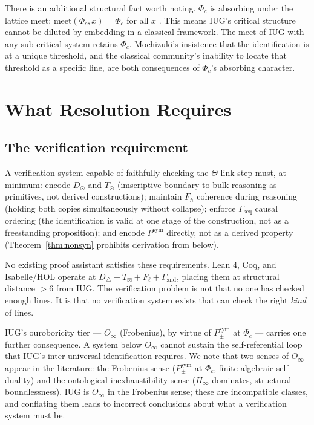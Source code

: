 \documentclass[12pt]{article}
\theoremstyle{plain}
\theoremstyle{definition}
\theoremstyle{remark}
\begin{document}
There is an additional structural fact worth noting. $\Phi_c$ is absorbing under the lattice
meet: $\text{meet}(\Phi_c, x) = \Phi_c$ for all $x$ \cite{synthref}. This means IUG's
critical structure cannot be diluted by embedding in a classical framework. The meet of IUG
with any sub-critical system retains $\Phi_c$. Mochizuki's insistence that the identification
is at a unique threshold, and the classical community's inability to locate that threshold
as a specific line, are both consequences of $\Phi_c$'s absorbing character.

\section{What Resolution Requires}
\label{sec:resolution}

\subsection{The verification requirement}
\label{subsec:requirement}

A verification system capable of faithfully checking the $\Theta$-link step must,
at minimum: encode $D_\odot$ and $T_\odot$ (imscriptive boundary-to-bulk reasoning as
primitives, not derived constructions); maintain $F_\hbar$ coherence during reasoning
(holding both copies simultaneously without collapse); enforce $\Gamma_\text{seq}$ causal
ordering (the identification is valid at one stage of the construction, not as a
freestanding proposition); and encode $P_\pm^\text{sym}$ directly, not as a derived
property (Theorem~\ref{thm:nonsyn} prohibits derivation from below).

No existing proof assistant satisfies these requirements. Lean 4, Coq, and Isabelle/HOL
operate at $D_\triangle + T_\boxtimes + F_\ell + \Gamma_\text{and}$, placing them at
structural distance $> 6$ from IUG. The verification problem is not that no one has
checked enough lines. It is that no verification system exists that can check the right
\emph{kind} of lines.

IUG's ouroboricity tier --- $O_\infty$ (Frobenius), by virtue of $P_\pm^\text{sym}$ at
$\Phi_c$ --- carries one further consequence. A system below $O_\infty$ cannot sustain the
self-referential loop that IUG's inter-universal identification requires. We note that two
senses of $O_\infty$ appear in the literature: the Frobenius sense ($P_\pm^\text{sym}$ at
$\Phi_c$, finite algebraic self-duality) and the ontological-inexhaustibility sense ($H_\infty$
dominates, structural boundlessness). IUG is $O_\infty$ in the Frobenius sense; these are
incompatible classes, and conflating them leads to incorrect conclusions about what a
verification system must be.
\end{document}
